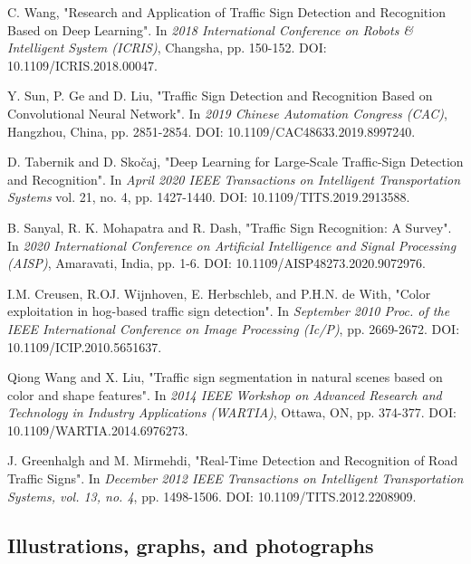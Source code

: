 \documentclass[10pt,twocolumn,letterpaper]{article}
\begin{document}
\begin{thebibliography}{9}
		C. Wang, "Research and Application of Traffic Sign Detection and Recognition Based on Deep Learning". In \textit{2018 International Conference on Robots \& Intelligent System (ICRIS)}, Changsha, pp. 150-152. DOI: 10.1109/ICRIS.2018.00047.
	
		Y. Sun, P. Ge and D. Liu, "Traffic Sign Detection and Recognition Based on Convolutional Neural Network". In \textit{2019 Chinese Automation Congress (CAC)}, Hangzhou, China, pp. 2851-2854. DOI: 10.1109/CAC48633.2019.8997240.
		
		D. Tabernik and D. Skočaj, "Deep Learning for Large-Scale Traffic-Sign Detection and Recognition". In \textit{April 2020 IEEE Transactions on Intelligent Transportation Systems} vol. 21, no. 4, pp. 1427-1440. DOI: 10.1109/TITS.2019.2913588.
	
		B. Sanyal, R. K. Mohapatra and R. Dash, "Traffic Sign Recognition: A Survey". In \textit{2020 International Conference on Artificial Intelligence and Signal Processing (AISP)}, Amaravati, India, pp. 1-6. DOI: 10.1109/AISP48273.2020.9072976.
		
		 I.M. Creusen, R.OJ. Wijnhoven, E. Herbschleb, and P.H.N. de With, "Color exploitation in hog-based traffic sign detection". In  \textit{September 2010 Proc. of the IEEE International Conference on Image Processing (Ic/P)}, pp. 2669-2672. DOI: 10.1109/ICIP.2010.5651637.
		 
		Qiong Wang and X. Liu, "Traffic sign segmentation in natural scenes based on color and shape features". In \textit{2014 IEEE Workshop on Advanced Research and Technology in Industry Applications (WARTIA)}, Ottawa, ON, pp. 374-377. DOI: 10.1109/WARTIA.2014.6976273.
		
		J. Greenhalgh and M. Mirmehdi, "Real-Time Detection and Recognition of Road Traffic Signs". In \textit{December 2012 IEEE Transactions on Intelligent Transportation Systems, vol. 13, no. 4}, pp. 1498-1506. DOI: 10.1109/TITS.2012.2208909.
		
\end{thebibliography}

\subsection{Illustrations, graphs, and photographs}
\end{document}
